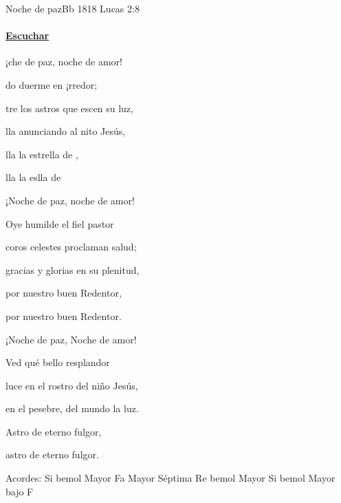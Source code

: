 \documentclass[12pt, spanish]{book}
\begin{document}
    \begin{song}{Noche de paz}{Bb}
    {1818} %
    {\SBPubDom}
    {Lucas 2:8} %
    {}
        \ifChordBk
            \paragraph{\mbox{}\hfill\protect\href{https://open.spotify.com/intl-es/track/3EoFH1vq4xAXpPKN9vlUbl}{Escuchar}\mbox{}\hfill}
        \fi

        \begin{SBOpGroup}
            ¡che de paz, noche de amor!

            do duerme en ¡rredor;

            tre los astros que escen su luz,

            lla anunciando al nito Jesús,

            lla la estrella de ,

            lla la eslla de 
        \end{SBOpGroup}
        \vskip 20pt
        \begin{SBOpGroup}
            ¡Noche de paz, noche de amor!

            Oye humilde el fiel pastor

            coros celestes proclaman salud;

            gracias y glorias en su plenitud,

            por nuestro buen Redentor,

            por nuestro buen Redentor.
        \end{SBOpGroup}
        \clearpage
        \begin{SBOpGroup}
            ¡Noche de paz, Noche de amor!

            Ved qué bello resplandor

            luce en el rostro del niño Jesús,

            en el pesebre, del mundo la luz.

            Astro de eterno fulgor,

            astro de eterno fulgor.
        \end{SBOpGroup}

        \ifChordBk
        \begin{SBOpGroup}
            Acordes:\null\break
            \upchord{\Bflat}\qquad Si bemol Mayor \hfill
            \upchord{\Fseven}\qquad Fa Mayor S\'eptima \hfill\null\break
            \upchord{\Eflat}Re bemol Mayor \hfill
            \upchord{\BflatF}\qquad Si bemol Mayor bajo F \hfill\null\break
        \end{SBOpGroup}
        \fi
    \end{song}
\end{document}

